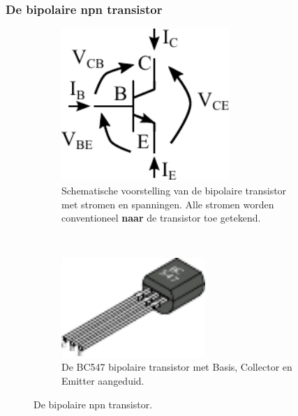 \documentclass{article}
\begin{document}
			\subsubsection{De bipolaire npn transistor}
				\begin{figure}[htbp]
				\centering
					\begin{subfigure}[b]{0.45\linewidth}
						\centering
					\includegraphics[width=0.7\textwidth]{transistor_VI}
					\caption{Schematische voorstelling van de bipolaire transistor met stromen en spanningen. Alle stromen worden conventioneel \textbf{naar} de transistor toe getekend.}
					\label{subfig:transistor_vi}
					\end{subfigure}
					~
					\begin{subfigure}[b]{0.45\linewidth}
						\centering
						\includegraphics[width=0.6\textwidth]{transistor}
						\caption{De BC547 bipolaire transistor met Basis, Collector en Emitter aangeduid.}
						\label{subfig:transistor_bce}
					\end{subfigure}
					
					\caption{De bipolaire npn transistor.}
					\label{fig:transistor}
				\end{figure}
\end{document}
